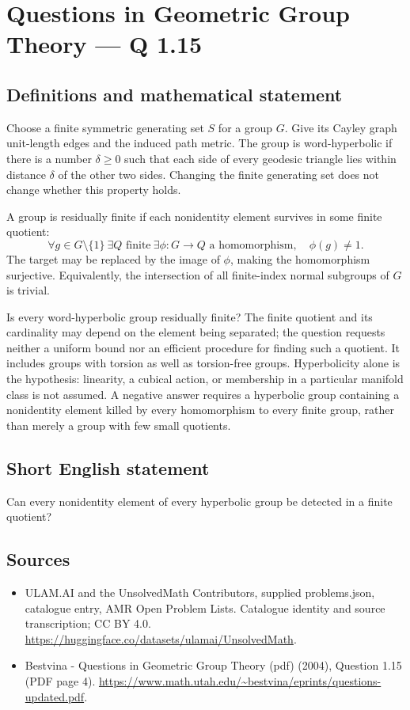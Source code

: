 \documentclass[11pt,a4paper]{article}
\begin{document}
\section*{Questions in Geometric Group Theory — Q 1.15}\label{statement}

\subsection{Definitions and mathematical statement}
Choose a finite symmetric generating set $S$ for a group $G$. Give its Cayley graph unit-length edges and the induced path metric. The group is word-hyperbolic if there is a number $\delta\geq0$ such that each side of every geodesic triangle lies within distance $\delta$ of the other two sides. Changing the finite generating set does not change whether this property holds.

A group is residually finite if each nonidentity element survives in some finite quotient:
\[
 \forall g\in G\setminus\{1\}\ \exists Q\text{ finite}\
 \exists\phi:G\to Q\text{ a homomorphism},\quad\phi(g)\ne1.
\]
The target may be replaced by the image of $\phi$, making the homomorphism surjective. Equivalently, the intersection of all finite-index normal subgroups of $G$ is trivial.

Is every word-hyperbolic group residually finite? The finite quotient and its cardinality may depend on the element being separated; the question requests neither a uniform bound nor an efficient procedure for finding such a quotient. It includes groups with torsion as well as torsion-free groups. Hyperbolicity alone is the hypothesis: linearity, a cubical action, or membership in a particular manifold class is not assumed. A negative answer requires a hyperbolic group containing a nonidentity element killed by every homomorphism to every finite group, rather than merely a group with few small quotients.
\subsection{Short English statement}
Can every nonidentity element of every hyperbolic group be detected in a finite quotient?
\subsection{Sources}
\begin{itemize}
\item[S1] ULAM.AI and the UnsolvedMath Contributors, supplied problems.json, catalogue entry, AMR Open Problem Lists. Catalogue identity and source transcription; CC BY 4.0.
\url{https://huggingface.co/datasets/ulamai/UnsolvedMath}.
\item[S2] Bestvina - Questions in Geometric Group Theory (pdf) (2004), Question 1.15 (PDF page 4). 
\url{https://www.math.utah.edu/~bestvina/eprints/questions-updated.pdf}.
\end{itemize}
\end{document}
